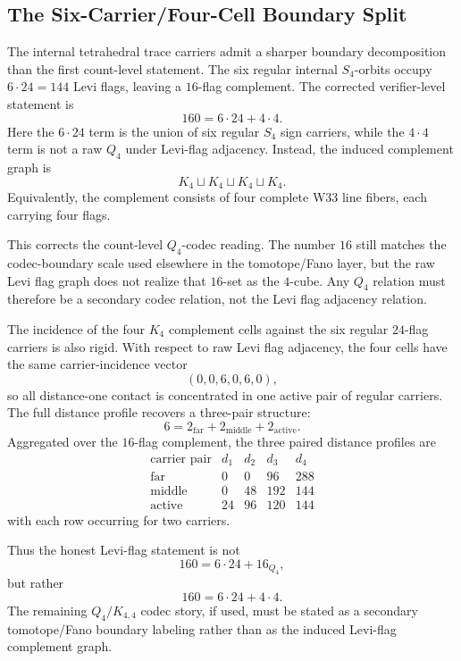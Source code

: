 \subsection{The Six-Carrier/Four-Cell Boundary Split}

The internal tetrahedral trace carriers admit a sharper boundary decomposition than the first count-level statement.  The six regular internal \(S_4\)-orbits occupy \(6\cdot 24=144\) Levi flags, leaving a \(16\)-flag complement.  The corrected verifier-level statement is
\[
160=6\cdot 24+4\cdot 4.
\]
Here the \(6\cdot 24\) term is the union of six regular \(S_4\) sign carriers, while the \(4\cdot4\) term is not a raw \(Q_4\) under Levi-flag adjacency.  Instead, the induced complement graph is
\[
K_4\sqcup K_4\sqcup K_4\sqcup K_4.
\]
Equivalently, the complement consists of four complete W33 line fibers, each carrying four flags.

This corrects the count-level \(Q_4\)-codec reading.  The number \(16\) still matches the codec-boundary scale used elsewhere in the tomotope/Fano layer, but the raw Levi flag graph does not realize that \(16\)-set as the \(4\)-cube.  Any \(Q_4\) relation must therefore be a secondary codec relation, not the Levi flag adjacency relation.

The incidence of the four \(K_4\) complement cells against the six regular \(24\)-flag carriers is also rigid.  With respect to raw Levi flag adjacency, the four cells have the same carrier-incidence vector
\[
(0,0,6,0,6,0),
\]
so all distance-one contact is concentrated in one active pair of regular carriers.  The full distance profile recovers a three-pair structure:
\[
6=2_{\mathrm{far}}+2_{\mathrm{middle}}+2_{\mathrm{active}}.
\]
Aggregated over the \(16\)-flag complement, the three paired distance profiles are
\[
\begin{array}{c|cccc}
\text{carrier pair} & d_1 & d_2 & d_3 & d_4\\
\hline
\text{far} & 0 & 0 & 96 & 288\\
\text{middle} & 0 & 48 & 192 & 144\\
\text{active} & 24 & 96 & 120 & 144
\end{array}
\]
with each row occurring for two carriers.

Thus the honest Levi-flag statement is not
\[
160=6\cdot24+16_{Q_4},
\]
but rather
\[
\boxed{160=6\cdot24+4\cdot4.}
\]
The remaining \(Q_4/K_{4,4}\) codec story, if used, must be stated as a secondary tomotope/Fano boundary labeling rather than as the induced Levi-flag complement graph.
